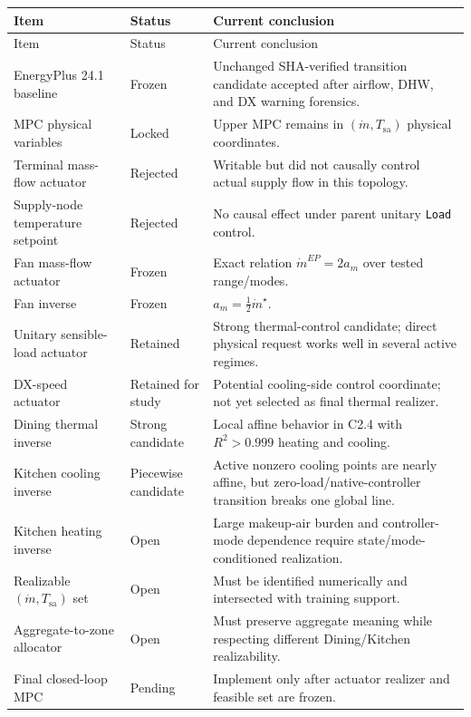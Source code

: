 \documentclass[11pt]{article}
\newcommand{\mdot}{\dot m}
\begin{document}
\begin{longtable}{p{}p{}p{}}
\toprule
Item & Status & Current conclusion \\
\midrule
\endfirsthead
\toprule
Item & Status & Current conclusion \\
\midrule
\endhead
EnergyPlus 24.1 baseline & Frozen & Unchanged SHA-verified transition candidate accepted after airflow, DHW, and DX warning forensics. \\
MPC physical variables & Locked & Upper MPC remains in $(\mdot,T_{\mathrm{sa}})$ physical coordinates. \\
Terminal mass-flow actuator & Rejected & Writable but did not causally control actual supply flow in this topology. \\
Supply-node temperature setpoint & Rejected & No causal effect under parent unitary \texttt{Load} control. \\
Fan mass-flow actuator & Frozen & Exact relation $\mdot^{EP}=2a_m$ over tested range/modes. \\
Fan inverse & Frozen & $a_m=\tfrac12\mdot^\star$. \\
Unitary sensible-load actuator & Retained & Strong thermal-control candidate; direct physical request works well in several active regimes. \\
DX-speed actuator & Retained for study & Potential cooling-side control coordinate; not yet selected as final thermal realizer. \\
Dining thermal inverse & Strong candidate & Local affine behavior in C2.4 with $R^2>0.999$ heating and cooling. \\
Kitchen cooling inverse & Piecewise candidate & Active nonzero cooling points are nearly affine, but zero-load/native-controller transition breaks one global line. \\
Kitchen heating inverse & Open & Large makeup-air burden and controller-mode dependence require state/mode-conditioned realization. \\
Realizable $(\mdot,T_{\mathrm{sa}})$ set & Open & Must be identified numerically and intersected with training support. \\
Aggregate-to-zone allocator & Open & Must preserve aggregate meaning while respecting different Dining/Kitchen realizability. \\
Final closed-loop MPC & Pending & Implement only after actuator realizer and feasible set are frozen. \\
\bottomrule
\end{longtable}
\end{document}

